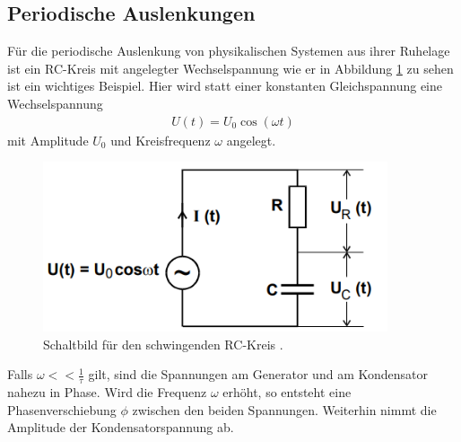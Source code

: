 \subsection{Periodische Auslenkungen}
\label{sec:per_ausl}
Für die periodische Auslenkung von physikalischen Systemen aus ihrer Ruhelage ist ein RC-Kreis mit angelegter Wechselspannung
wie er in Abbildung \ref{fig:schwingend} zu sehen ist ein wichtiges Beispiel.
Hier wird statt einer konstanten Gleichspannung eine Wechselspannung 
\begin{align}
    U(t) = U_0 \cos(\omega t)
\end{align}
mit Amplitude $U_0$ und Kreisfrequenz $\omega$ angelegt. 
\begin{figure}[H]
    \centering
    \includegraphics[height=5cm]{abbildungen/oszillatorisch.png}
    \caption{Schaltbild für den schwingenden RC-Kreis \cite{man:v353}.}
    \label{fig:schwingend}
\end{figure}

\noindent
Falls $\omega << \frac{1}{\tau}$ gilt, sind die Spannungen am Generator und am Kondensator nahezu in Phase.
Wird die Frequenz $\omega$ erhöht, so entsteht eine Phasenverschiebung $\phi$ zwischen den beiden Spannungen.
Weiterhin nimmt die Amplitude der Kondensatorspannung ab.

